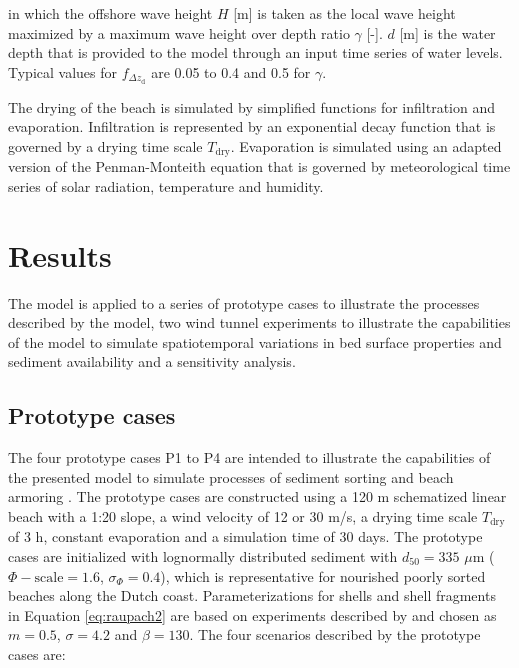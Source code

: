 \noindent in which the offshore wave height $H$ [m] is taken as the
local wave height maximized by a maximum wave height over depth ratio
$\gamma$ [-]. $d$ [m] is the water depth that is provided to the model
through an input time series of water levels. Typical values for
$f_{\Delta z_{\mathrm{d}}}$ are 0.05 to 0.4 and 0.5 for $\gamma$.

The drying of the beach is simulated by simplified functions for
infiltration and evaporation. Infiltration is represented by an
exponential decay function that is governed by a drying time scale
$T_{\mathrm{dry}}$. Evaporation is simulated using an adapted version
of the Penman-Monteith equation \citep{Shuttleworth1993} that is
governed by meteorological time series of solar radiation, temperature
and humidity.

\section{Results} \label{sec:results}

The model is applied to a series of prototype cases to illustrate the
processes described by the model, two wind tunnel experiments to
illustrate the capabilities of the model to simulate spatiotemporal
variations in bed surface properties and sediment availability and a
sensitivity analysis.

\subsection{Prototype cases} \label{sec:prototype}

The four prototype cases P1 to P4 are intended to illustrate the
capabilities of the presented model to simulate processes of sediment
sorting \citep{VanDerWal2000, Arens2002} and beach armoring
\citep{VanDerWal1998}. The prototype cases are constructed using a 120
m schematized linear beach with a 1:20 slope, a wind velocity of 12 or
30 m/s, a drying time scale $T_{\mathrm{dry}}$ of 3 h, constant
evaporation and a simulation time of 30 days. The prototype cases are
initialized with lognormally distributed sediment with $d_{50} = 335$
$\mu \mathrm{m}$ ($\Phi-\mathrm{scale} = 1.6$, $\sigma_{\Phi} = 0.4$),
which is representative for nourished poorly sorted beaches along the
Dutch coast.  Parameterizations for shells and shell fragments in
Equation \ref{eq:raupach2} are based on experiments described by
\citet{McKennaNeuman2012} and chosen as $m = 0.5$, $\sigma = 4.2$ and
$\beta = 130$. The four scenarios described by the prototype cases
are:

